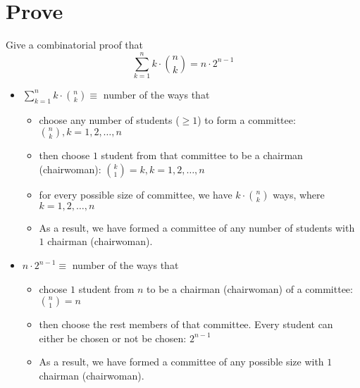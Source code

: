 \documentclass[a4paper]{article}
\begin{document}
\section*{Prove}
Give a combinatorial proof that
$$
\sum_{k=1}^n k\cdot \binom{n}{k} = n \cdot 2^{n-1}
$$
\begin{itemize}
    \item $\sum_{k=1}^n k\cdot \binom{n}{k}\equiv$ number of the ways that 
        \begin{itemize}
            \item choose any number of students ($\geq1$) to form a committee: $\binom{n}{k}, k=1,2,\dots,n$
            \item then choose $1$ student from that committee to be a chairman (chairwoman): $\binom{k}{1}=k, k=1,2,\dots,n$
            \item for every possible size of committee, we have $k\cdot\binom{n}{k}$ ways, where $k=1,2,\dots,n$
            \item As a result, we have formed a committee of any number of students with $1$ chairman (chairwoman).
        \end{itemize}
    \item $n \cdot 2^{n-1}\equiv$ number of the ways that 
        \begin{itemize}
            \item choose $1$ student from $n$ to be a chairman (chairwoman) of a committee: $\binom{n}{1}=n$
            \item then choose the rest members of that committee. Every student can either be chosen or not be chosen: $2^{n-1}$
            \item As a result, we have formed a committee of any possible size with $1$ chairman (chairwoman).
        \end{itemize}
\end{itemize}
\end{document}
